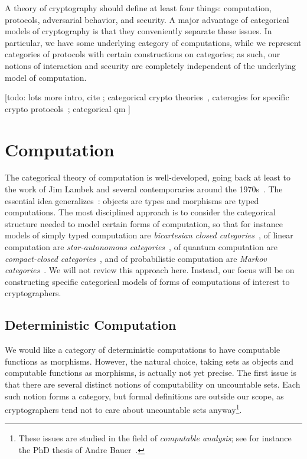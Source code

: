 A theory of cryptography should define at least four things: computation,
protocols, adversarial behavior, and security. A major advantage of categorical
models of cryptography is that they conveniently separate these issues. In
particular, we have some underlying category of computations, while we represent
categories of protocols with certain constructions on categories; as such, our
notions of interaction and security are completely independent of the underlying
model of computation.

[todo: lots more intro,
cite \cite{broadbent-karvonen-2022};
categorical crypto theories~\cite{hines-2020,pavlovic-2012,pavlovic-2014,stay-vicary-2013},
caterogies for specific crypto protocols~\cite{bkm-2019, bmr-2019}; categorical
qm
\cite{abramsky-coecke-2004,coecke-perdrix-2012,heunen-vicary-2014,coecke-kissinger-2017,chitambar-gour-2019}]

\section{Computation}

The categorical theory of computation is well-developed, going back at least to
the work of Jim Lambek and several contemporaries around the
1970s~\cite{lambeck-1974,lambeck-1980,lawvere-1969,seely-1984}. The essential
idea generalizes~: objects are types
and morphisms are typed computations. The most disciplined approach is to
consider the categorical structure needed to model certain forms of computation, so that
for instance models of simply typed computation are \emph{bicartesian closed
categories}~\cite{lambeck-1974}, of linear computation are \emph{star-autonomous
categories}~\cite{seely-1989}, of quantum computation are \emph{compact-closed
categories}~\cite{abramsky-coecke-2004}, and of probabilistic computation are \emph{Markov
categories}~\cite{fritz-2020}. We will not review this approach here. Instead,
our focus will be on constructing specific categorical models of forms of
computations of interest to cryptographers.

\subsection{Deterministic Computation}

We would like a category of deterministic computations to have computable
functions as morphisms. However, the natural choice, taking sets as objects and
computable functions as morphisms, is actually not yet precise. The first issue
is that there are several distinct notions of computability on uncountable sets.
Each such notion forms a category, but formal definitions are outside our scope,
as cryptographers tend not to care about uncountable sets anyway\footnote{These
issues are studied in the field of \emph{computable analysis}; see for instance
the PhD thesis of Andre Bauer~\cite{bauer-2000}.}.

